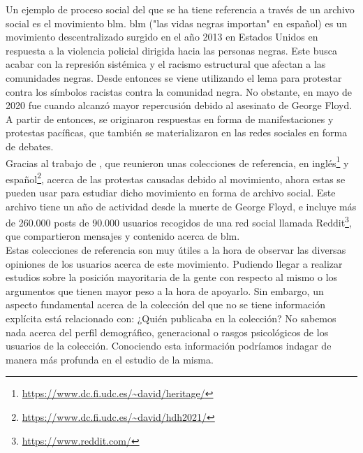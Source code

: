 Un ejemplo de proceso social del que se ha tiene referencia a través de un archivo social es el movimiento \acrfull{blm}. \acrlong{blm} ("las vidas negras importan" en español) es un movimiento descentralizado surgido en el año 2013 en Estados Unidos en respuesta a la violencia policial dirigida hacia las personas negras. Este busca acabar con la represión sistémica y el racismo estructural que afectan a las comunidades negras. Desde entonces se viene utilizando el lema para protestar contra los símbolos racistas contra la comunidad negra. No obstante, en mayo de 2020 fue cuando alcanzó mayor repercusión debido al asesinato de George Floyd. A partir de entonces, se originaron respuestas en forma de manifestaciones y protestas pacíficas, que también se materializaron en las redes sociales en forma de debates.\\
Gracias al trabajo de \cite{heritage_BLM}, que reunieron unas colecciones de referencia, en inglés\footnote{\url{https://www.dc.fi.udc.es/~david/heritage/}} y español\footnote{\url{https://www.dc.fi.udc.es/~david/hdh2021/}}, acerca de las protestas causadas debido al movimiento, ahora estas se pueden usar para estudiar dicho movimiento en forma de archivo social. Este archivo tiene un año de actividad desde la muerte de George Floyd, e incluye más de 260.000 posts de 90.000 usuarios recogidos de una red social llamada Reddit\footnote{\url{https://www.reddit.com/}}, que compartieron mensajes y contenido acerca de \acrshort{blm}.\\
Estas colecciones de referencia son muy útiles a la hora de observar las diversas opiniones de los usuarios acerca de este movimiento. Pudiendo llegar a realizar estudios sobre la posición mayoritaria de la gente con respecto al mismo o los argumentos que tienen mayor peso a la hora de apoyarlo. Sin embargo, un aspecto fundamental acerca de la colección del que no se tiene información explícita está relacionado con: ¿Quién publicaba en la colección? No sabemos nada acerca del perfil demográfico, generacional o rasgos psicológicos de los usuarios de la colección. Conociendo esta información podríamos indagar de manera más profunda en el estudio de la misma.

